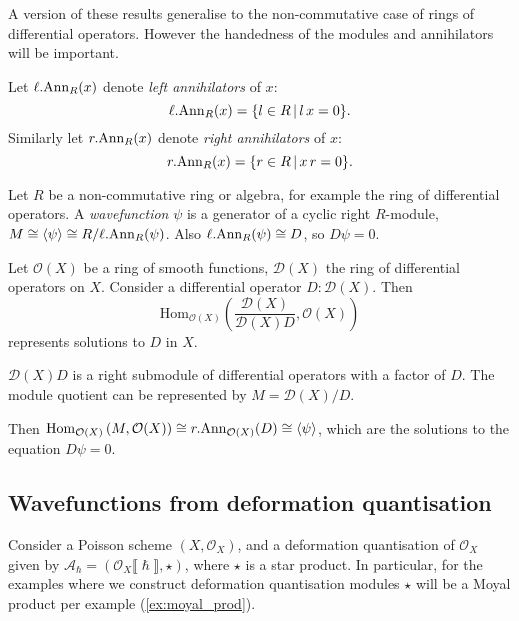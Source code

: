     
    A version of these results generalise to the non-commutative case of rings of differential operators. However the handedness of the modules and annihilators will be important.
    
    \begin{defn}
    Let \( {\ell.\mathrm{Ann}}_R(x) \) denote \emph{left annihilators} of \(x\):
    \[ {\ell.\mathrm{Ann}}_R(x) = \{ l \in R\, | \, l\, x = 0\}. \]
    Similarly let \({r.\mathrm{Ann}}_R(x)\) denote \emph{right annihilators} of \(x\):
    \[ {r.\mathrm{Ann}}_R(x) = \{r \in R \,| \,x \,r = 0 \}. \]
    \end{defn}     
    

    Let \(R\) be a non-commutative ring or algebra, for example the ring of differential operators.  A \emph{wavefunction} \( \psi\) is a generator of a cyclic right \(R\)-module, \(M  \cong \langle \psi \rangle \cong R/{\ell.\mathrm{Ann}}_R(\psi) \). Also \({\ell.\mathrm{Ann}}_R(\psi) \cong D\), so \( D \psi = 0\).
    
    \begin{ex}\label{ex:sols}
    Let \( \mathcal{O}(X)\) be a ring of smooth functions, \( \mathcal{D}(X)\) the ring of differential operators on \(X\). Consider a differential operator \( D : \mathcal{D}(X)\). Then 
    \[ \mathrm{Hom}_{\mathcal{O}(X)}\left(\frac{\mathcal{D}(X)}{  \mathcal{D}(X)  D } , \mathcal{O}(X) \right)\]  
    represents solutions to \(D\) in \(X\).
    
    \(\mathcal{D}(X)  D \) is a right submodule of differential operators with a factor of \(D\). The module quotient can be represented by \(M=\mathcal{D}(X)/D\).  
    
    Then \( \mathrm{Hom}_{\mathcal{O}(X)}\left(M, \mathcal{O}(X) \right) \cong {r.\mathrm{Ann}}_{\mathcal{O}(X)}(D) \cong \langle \psi \rangle\), which are the solutions to the equation 
    \( D \psi = 0\). 
    \end{ex}
    \subsection{Wavefunctions from deformation quantisation}

    
    Consider a Poisson scheme \((X,\mathcal{O}_X)\), and a deformation quantisation of \( \mathcal{O}_X\) given by \( \mathcal{A}_{\hslash} = (\mathcal{O}_X\lBrack \hslash \rBrack,\star )\), where \( \star\) is a star product. In particular, for the examples where we construct deformation quantisation modules \( \star\) will be a Moyal product per example (\ref{ex:moyal_prod}). 
    
